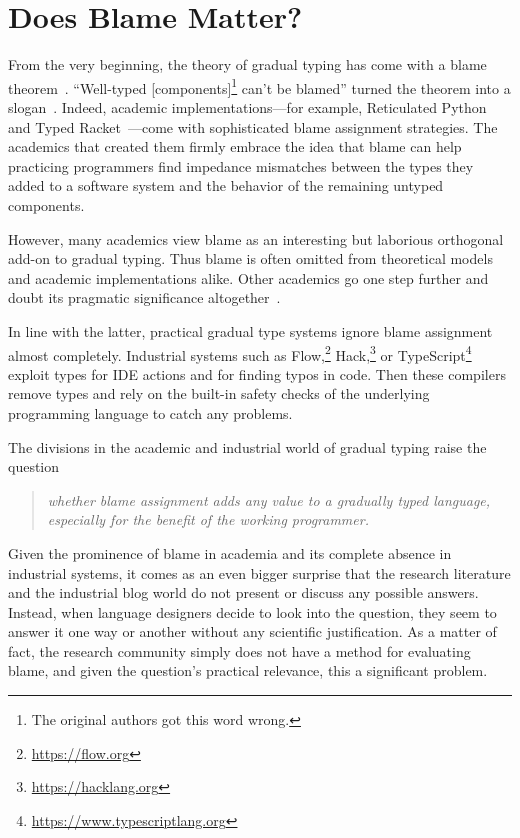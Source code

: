 \section{Does Blame Matter?} \label{sec:introduction}

From the very beginning, the theory of gradual typing has come with a
blame theorem~\cite{mf-toplas-2009, tf-dls-2006}. ``Well-typed
[components]\footnote{The original authors got this word wrong.} can't be
blamed'' turned the theorem into a slogan~\cite{wf-esop-2009}. Indeed,
academic implementations---for example, Reticulated
Python~\cite{vsc-dls-2019, vss-popl-2017, vksb-dls-2014} and Typed
Racket~\cite{tf-dls-2006,tf-popl-2008,tfffgksst-snapl-2017,tf-icfp-2010}---come
with sophisticated blame assignment strategies. The academics that
created them firmly embrace the idea that blame can help practicing
programmers find impedance mismatches between the types they added to a
software system and the behavior of the remaining untyped components.

However, many academics view blame as an interesting but laborious
orthogonal add-on to 
gradual typing. Thus blame is often omitted from theoretical models and
academic implementations alike.
Other academics go one step further and doubt its pragmatic significance altogether~\cite{cc-snapl-19}.

In line with the latter, practical gradual type systems ignore blame assignment almost completely.
Industrial systems such as Flow,\footnote{\url{https://flow.org}}
Hack,\footnote{\url{https://hacklang.org}} or
TypeScript\footnote{\url{https://www.typescriptlang.org}} exploit types for IDE actions and for finding typos in
code. Then these compilers remove types and rely on the built-in safety checks of
the underlying programming language to catch any problems.

The divisions in the academic and industrial world of gradual typing raise the question 
\begin{quote}
 \it
 whether blame assignment adds any value to a gradually typed language, \\
 especially for the benefit of the working programmer.
\end{quote}
Given the prominence of blame in academia and its complete absence in
industrial systems, it comes as an even bigger surprise that the research
literature and the industrial blog world do not present or discuss any
possible answers.  Instead, when language designers decide to look into the
question, they seem to answer it one way or another without any scientific
justification. As a matter of fact, the research community simply does not have a
method for evaluating blame, and given the question's practical
relevance, this a significant problem.

